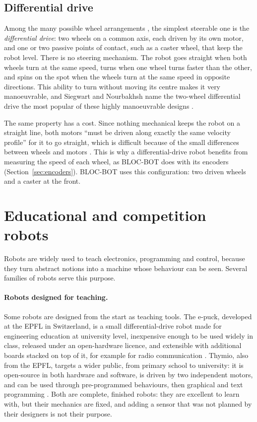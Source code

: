 \subsection{Differential drive}
\label{sec:diff-drive}
Among the many possible wheel arrangements \cite{siegwart2004}, the simplest steerable
one is the \emph{differential drive}: two wheels on a common axis, each driven by its own
motor, and one or two passive points of contact, such as a caster wheel, that keep the
robot level. There is no steering mechanism. The robot goes straight when both wheels turn
at the same speed, turns when one wheel turns faster than the other, and spins on the spot
when the wheels turn at the same speed in opposite directions. This ability to turn
without moving its centre makes it very manoeuvrable, and Siegwart and Nourbakhsh name the
two-wheel differential drive the most popular of these highly manoeuvrable designs
\cite{siegwart2004}.

The same property has a cost. Since nothing mechanical keeps the robot on a straight line,
both motors ``must be driven along exactly the same velocity profile'' for it to go
straight, which is difficult because of the small differences between wheels and motors
\cite{siegwart2004}. This is why a differential-drive robot
benefits from measuring the speed of each wheel, as BLOC-BOT does with its encoders
(Section~\ref{sec:encoders}). BLOC-BOT uses this configuration: two driven wheels and a
caster at the front.

\section{Educational and competition robots}
\label{sec:edu-robots}
Robots are widely used to teach electronics, programming and control, because they turn
abstract notions into a machine whose behaviour can be seen. Several families of robots
serve this purpose.

\paragraph{Robots designed for teaching.} Some robots are designed from the start as
teaching tools. The e-puck, developed at the EPFL in Switzerland, is a small
differential-drive robot made for engineering education at university level, inexpensive
enough to be used widely in class, released under an open-hardware licence, and extensible
with additional boards stacked on top of it, for example for radio communication
\cite{mondada2009epuck}. Thymio, also from the EPFL, targets a wider public, from primary
school to university: it is open-source in both hardware and software, is driven by two
independent motors, and can be used through pre-programmed behaviours, then graphical and
text programming \cite{riedo2013thymio}. Both are complete, finished robots: they are
excellent to learn with, but their mechanics are fixed, and adding a sensor that was not
planned by their designers is not their purpose.

